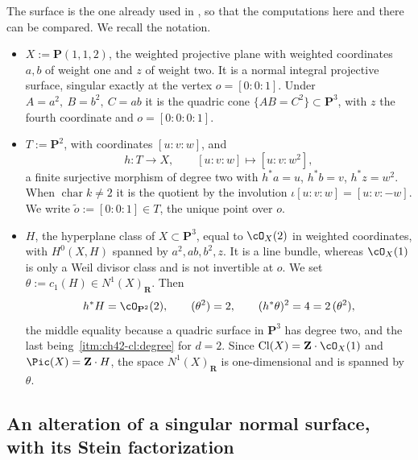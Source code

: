 The surface is the one already used in , so that
the computations here and there can be compared.  We recall the notation.

\begin{itemize}
\item $X:=\mathbf P(1,1,2)$, the weighted projective plane with weighted
      coordinates $a,b$ of weight one and $z$ of weight two.  It is a
      normal integral projective surface, singular exactly at the vertex
      $o=[0:0:1]$.  Under
      $A=a^2,\ B=b^2,\ C=ab$ it is the quadric cone
      $\{AB=C^2\}\subset\mathbf P^3$, with $z$ the fourth coordinate and
      $o=[0:0:0:1]$.
\item $T:=\mathbf P^2$, with coordinates $[u:v:w]$, and
      \[
       h:T\longrightarrow X,\qquad [u:v:w]\longmapsto[u:v:w^2],
      \]
      a finite surjective morphism of degree two with
      $h^*a=u$, $h^*b=v$, $h^*z=w^2$.  When
      $\operatorname{char}k\ne2$ it is the quotient by the involution
      $\iota[u:v:w]=[u:v:-w]$.  We write
      $\tilde o:=[0:0:1]\in T$, the unique point over $o$.
\item $H$, the hyperplane class of $X\subset\mathbf P^3$, equal to
      $\cO_X(2)$ in weighted coordinates, with
      $H^0(X,H)$ spanned by $a^2,ab,b^2,z$.  It is a line bundle, whereas
      $\cO_X(1)$ is only a Weil divisor class and is not invertible at
      $o$.  We set $\theta:=c_1(H)\in N^1(X)_{\mathbf R}$.  Then
      \[
       h^*H=\cO_{\mathbf P^2}(2),\qquad
       (\theta^2)=2,\qquad
       (h^*\theta)^2=4=2\,(\theta^2),
      \]
      the middle equality because a quadric surface in $\mathbf P^3$ has
      degree two, and the last being
      \,\cref{itm:ch42-cl:degree} for $d=2$.
      Since $\operatorname{Cl}(X)=\mathbf Z\cdot\cO_X(1)$ and
      $\Pic(X)=\mathbf Z\cdot H$, the space $N^1(X)_{\mathbf R}$ is
      one-dimensional and is spanned by $\theta$.
\end{itemize}

\subsection{An alteration of a singular normal surface, with its Stein
factorization}
\label{sec:ch42-cone-alteration}

